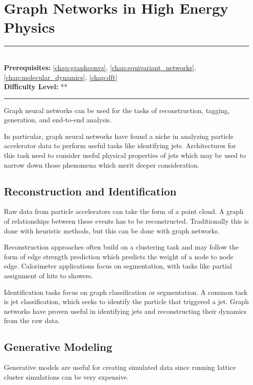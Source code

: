 \documentclass[book.tex]{subfiles}
\begin{document}
\chapter{Graph Networks in High Energy Physics}

\label{chap:gnn_hep}
\noindent\rule{11cm}{0.4pt} \\
\textbf{Prerequisites:} \autoref{chap:graphconvs}, \autoref{chap:equivariant_networks}, \autoref{chap:molecular_dynamics},  \autoref{chap:dft} \\
\textbf{Difficulty Level:} ** \\
\noindent\rule{11cm}{0.4pt}
\vspace{5mm}

Graph neural networks can be used for the tasks of reconstruction, tagging, generation, and end-to-end analysis.

In particular, graph neural networks have found a niche in analyzing particle accelerator data to perform useful tasks like identifying jets. Architectures for this task need to consider useful physical properties of jets which may be used to narrow down those phenomena which merit deeper consideration.

\section{Reconstruction and Identification}

Raw data from particle accelerators can take the form of a point cloud. A graph of relationships between these events has to be reconstructed. Traditionally this is done with heuristic methods, but this can be done with graph networks.

Reconstruction approaches often build on a clustering task and may follow the form of edge strength prediction which predicts the weight of a node to node edge. Calorimeter applications focus on segmentation, with tasks like partial assignment of hits to showers.

Identification tasks focus on graph classification or segmentation. A common task is jet classification, which seeks to identify the particle that triggered a jet. Graph networks have proven useful in identifying jets and reconstructing their dynamics from the raw data.

\section{Generative Modeling}

Generative models are useful for creating simulated data since running lattice cluster simulations can be very expensive.
\end{document}
